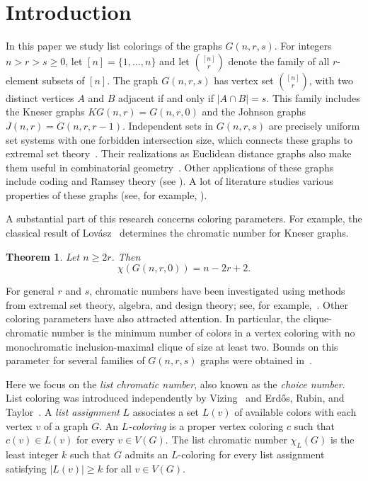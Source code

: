 \documentclass[10pt,a4paper]{article}
\newtheorem{theorem}{Theorem}
\theoremstyle{remark}
\theoremstyle{definition}
\begin{document}
\section{Introduction}

In this paper we study list colorings of the graphs $G(n,r,s)$. For integers $n > r > s \geq 0$, let $[n]=\{1,\ldots,n\}$ and let $\binom{[n]}{r}$ denote the family of all $r$-element subsets of $[n]$. The graph $G(n,r,s)$ has vertex set $\binom{[n]}{r}$, with two distinct vertices $A$ and $B$ adjacent if and only if $|A\cap B|=s$. This family includes the Kneser graphs $KG(n,r)=G(n,r,0)$ and the Johnson graphs $J(n,r)=G(n,r,r-1)$. Independent sets in $G(n,r,s)$ are precisely uniform set systems with one forbidden intersection size, which connects these graphs to extremal set theory~\cite{FrFu}. Their realizations as Euclidean distance graphs also make them useful in combinatorial geometry~\cite{FrW}. Other applications of these graphs include coding and Ramsey theory (see \cite{Codes, Codes2, Spectrum}). A lot of literature studies various properties of these graphs (see, for example, \cite{RaiMeta,MSp,Shu1,Shu2}).

A substantial part of this research concerns coloring parameters.
For example, the classical result of Lov\'asz~\cite{Lovasz1978} determines the chromatic number for Kneser graphs.
\begin{theorem}\label{LovKG}
    Let $n \geq 2r$. Then
    $$
        \chi(G(n,r,0)) = n-2r+2.
    $$
\end{theorem}

For general $r$ and $s$, chromatic numbers have been investigated using methods from extremal set theory, algebra, and design theory; see, for example,~\cite{RaiMetaAlphaChrom,FrW,ZChrom}.
Other coloring parameters have also attracted attention. In particular, the clique-chromatic number is the minimum number of colors in a vertex coloring with no monochromatic inclusion-maximal clique of size at least two. Bounds on this parameter for several families of $G(n,r,s)$ graphs were obtained in~\cite{Rai1,DAM,ClChr2}.

Here we focus on the \emph{list chromatic number}, also known as the \emph{choice number}. List coloring was introduced independently by Vizing~\cite{Vizing1976} and Erd\H{o}s, Rubin, and Taylor~\cite{ERT1980}. A \emph{list assignment} $L$ associates a set $L(v)$ of available colors with each vertex $v$ of a graph $G$. An \emph{$L$-coloring} is a proper vertex coloring $c$ such that $c(v)\in L(v)$ for every $v\in V(G)$. The list chromatic number $\chi_L(G)$ is the least integer $k$ such that $G$ admits an $L$-coloring for every list assignment satisfying $|L(v)|\ge k$ for all $v\in V(G)$. 
\end{document}
